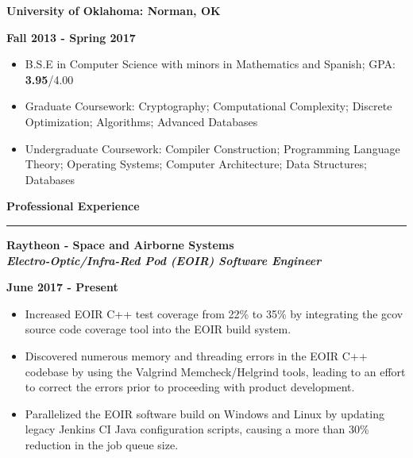 \documentclass[10pt,letterpaper]{article}
\begin{document}
\begin{minipage}[t]{0.5\textwidth}
	\begin{flushleft}
		\textbf{University of Oklahoma: Norman, OK}\\
		
	\end{flushleft}
\end{minipage}
\begin{minipage}[t]{0.47\textwidth}
	\begin{flushright}
		\textbf{Fall 2013 - Spring 2017}
		
	\end{flushright}
\end{minipage}
\begin{itemize}[topsep=0pt]
	\setlength\itemsep{-0.10em}
	\item B.S.E in Computer Science with minors in Mathematics and Spanish; GPA: \textbf{3.95}/{4.00}
	\item Graduate Coursework: Cryptography; Computational Complexity; Discrete Optimization;
	      Algorithms; Advanced Databases
	\item Undergraduate Coursework: Compiler Construction; Programming Language Theory;
	      Operating Systems; Computer Architecture; Data Structures; Databases
\end{itemize}

\medskip

\begin{large}
	\textbf{Professional Experience}
\end{large}

\smallskip \hrule \smallskip

\begin{minipage}[t]{0.53\textwidth}
	\begin{flushleft}
		\textbf{Raytheon - Space and Airborne Systems}\\
		\textbf{\textit{Electro-Optic/Infra-Red Pod (EOIR) Software Engineer}}\\
	\end{flushleft}
\end{minipage}
\begin{minipage}[t]{0.44\textwidth}
	\begin{flushright}
		\textbf{June 2017 - Present}
	\end{flushright}
\end{minipage}

\begin{itemize}[noitemsep,topsep=0pt]
	\setlength\itemsep{-0.10em}
	\item Increased EOIR C++ test coverage from 22\% to 35\% by integrating the gcov
	      source code coverage tool into the EOIR build system.
	\item Discovered numerous memory and threading errors in the EOIR C++ codebase
	      by using the Valgrind Memcheck/Helgrind tools, leading to an effort to correct
	      the errors prior to proceeding with product development.
	\item Parallelized the EOIR software build on Windows and Linux by updating legacy Jenkins
	      CI Java configuration scripts, causing a more than 30\% reduction in the job
	      queue size.
\end{itemize}
\end{document}
